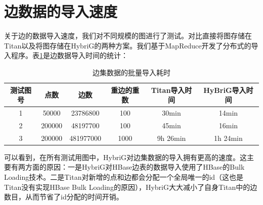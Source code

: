 \section{边数据的导入速度}
关于边的数据导入速度，我们对不同规模的图进行了测试。对比直接将图存储在Titan以及将图存储在HybriG的两种方案。我们基于MapReduce\supercite{mapreduce}开发了分布式的导入程序。表\ref{edge_load_perf}是边数据导入时间的统计：
\begin{table}[!hbp]
\begin{tabular}{|c|c|c|c|c|c|}
\hline
测试图号 & 点数 & 边数 & 重边的重数 & Titan导入时间 & HyBriG导入时间\\
\hline
1 & 50000 & 23786800 & 100 & 30min & 14min\\
\hline
2 & 200000 & 48197700 & 100 & 45min & 16min\\
\hline
3 & 200000 & 481977000 & 1000 & 9h 26min & 1h 24min\\
\hline
\end{tabular}
\caption{边集数据的批量导入耗时}
\label{edge_load_perf}
\end{table}
可以看到，在所有测试用图中，HybriG对边集数据的导入拥有更高的速度。这主要有两方面的原因：一是HybriG对HBase边表的数据导入使用了HBase的Bulk Loading技术。二是Titan对新增的点和边都会分配一个全局唯一的id（这也是Titan没有实现HBase Bulk Loading的原因），HybriG大大减小了自身Titan中的边数目，从而节省了id分配的时间开销。




